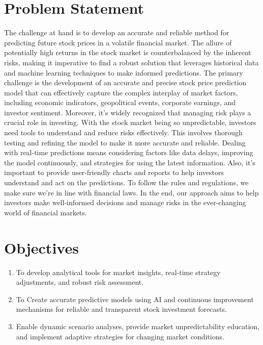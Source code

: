 \documentclass[./main.tex]{subfiles}
\begin{document}
\section{Problem Statement}
The challenge at hand is to develop an accurate and reliable method for predicting future stock prices in a volatile financial market. 
The allure of potentially high returns in the stock market is counterbalanced by the inherent risks, making it imperative to find a robust solution that leverages historical data and machine learning techniques to make informed predictions. 
\medskip 
\newline
\noindent 
The primary challenge is the development of an accurate and precise stock price prediction model that can effectively capture the complex interplay of market factors, including economic indicators, geopolitical events, corporate earnings, and investor sentiment.\cite{mohammed2020challenges} 
\medskip 
\newline
\noindent
Moreover, it's widely recognized that managing risk plays a crucial role in investing. With the stock market being so unpredictable, investors need tools to understand and reduce risks effectively. This involves thorough testing and refining the model to make it more accurate and reliable. Dealing with real-time predictions means considering factors like data delays, improving the model continuously, and strategies for using the latest information. Also, it's important to provide user-friendly charts and reports to help investors understand and act on the predictions. To follow the rules and regulations, we make sure we're in line with financial laws. In the end, our approach aims to help investors make well-informed decisions and manage risks in the ever-changing world of financial markets.

\section{Objectives}
\begin{enumerate}[label=\textasteriskcentered]

    \item To develop analytical tools for market insights, real-time strategy adjustments, and robust risk assessment.
    \item To Create accurate predictive models using AI and continuous improvement mechanisms for reliable and transparent stock investment forecasts.
    \item Enable dynamic scenario analyses, provide market unpredictability education, and implement adaptive strategies for changing market conditions.
\end{enumerate}
\end{document}
